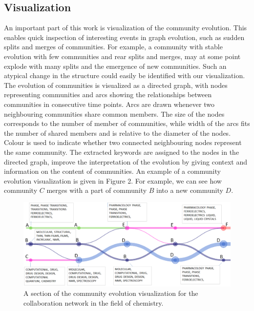 \documentclass{article} %
\begin{document}
\subsection{Visualization}
An important part of this work is visualization of the community evolution. This enables quick inspection of interesting events in graph evolution, such as sudden splits and merges of communities. For example, a community with stable evolution with few communities and rear splits and merges, may at some point explode with many splits and the emergence of new communities. Such an atypical change in the structure could easily be identified with our visualization. The evolution of communities is visualized as a directed graph, with nodes representing communities and arcs showing the relationships between communities in consecutive time points. Arcs are drawn whenever two neighbouring communities share common members. The size of the nodes corresponds to the number of member of communities, while width of the arcs fits the number of shared members and is relative to the diameter of the nodes. Colour is used to indicate whether two connected neighbouring nodes represent the same community. The extracted keywords are assigned to the nodes in the directed graph, improve the interpretation of the evolution by giving context and information on the content of communities. An example of a community evolution visualization is given in Figure 2. For example, we can see how community $C$ merges with a part of community $B$ into a new community $D$.
\begin{figure}\label{evolution}
   	\begin{center}
   	\includegraphics[width=1\textwidth]{evo.png}
   	\end{center}
   	\caption{A section of the community evolution visualization for the collaboration network in  the field of chemistry.}
\end{figure}
 
\end{document}
